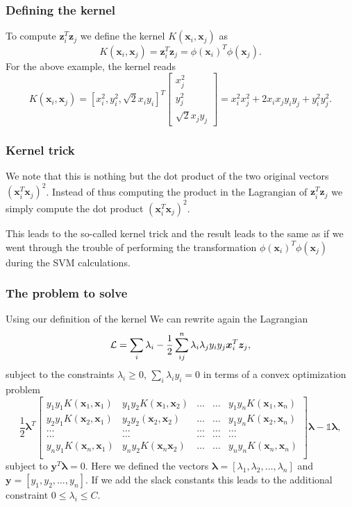 \documentclass{beamer}
\begin{document}
\begin{frame}
\frametitle{Defining the kernel}

To compute $\bm{z}_i^T\bm{z}_j$ we define the kernel $K(\bm{x}_i,\bm{x}_j)$ as
\[
K(\bm{x}_i,\bm{x}_j)=\bm{z}_i^T\bm{z}_j= \phi(\bm{x}_i)^T\phi(\bm{x}_j).
\]
For the above example, the kernel reads
\[
K(\bm{x}_i,\bm{x}_j)=[x_i^2, y_i^2, \sqrt{2}x_iy_i]^T\begin{bmatrix} x_j^2 \\ y_j^2 \\ \sqrt{2}x_jy_j \end{bmatrix}=x_i^2x_j^2+2x_ix_jy_iy_j+y_i^2y_j^2.
\]
\end{frame}

\begin{frame}
\frametitle{Kernel trick}

We note that this is nothing but the dot product of the two original
vectors $(\bm{x}_i^T\bm{x}_j)^2$. Instead of thus computing the
product in the Lagrangian of $\bm{z}_i^T\bm{z}_j$ we simply compute
the dot product $(\bm{x}_i^T\bm{x}_j)^2$.

This leads to the so-called
kernel trick and the result leads to the same as if we went through
the trouble of performing the transformation
$\phi(\bm{x}_i)^T\phi(\bm{x}_j)$ during the SVM calculations.
\end{frame}

\begin{frame}
\frametitle{The problem to solve}

Using our definition of the kernel We can rewrite again the Lagrangian
\[
{\cal L}=\sum_i\lambda_i-\frac{1}{2}\sum_{ij}^n\lambda_i\lambda_jy_iy_j\bm{x}_i^T\bm{z}_j,
\]
subject to the constraints $\lambda_i\geq 0$, $\sum_i\lambda_iy_i=0$ in terms of a convex optimization problem
\[
\frac{1}{2} \bm{\lambda}^T\begin{bmatrix} y_1y_1K(\bm{x}_1,\bm{x}_1) & y_1y_2K(\bm{x}_1,\bm{x}_2) & \dots & \dots & y_1y_nK(\bm{x}_1,\bm{x}_n) \\
y_2y_1K(\bm{x}_2,\bm{x}_1) & y_2y_2(\bm{x}_2,\bm{x}_2) & \dots & \dots & y_1y_nK(\bm{x}_2,\bm{x}_n) \\
\dots & \dots & \dots & \dots & \dots \\
\dots & \dots & \dots & \dots & \dots \\
y_ny_1K(\bm{x}_n,\bm{x}_1) & y_ny_2K(\bm{x}_n\bm{x}_2) & \dots & \dots & y_ny_nK(\bm{x}_n,\bm{x}_n) \\
\end{bmatrix}\bm{\lambda}-\mathbb{1}\bm{\lambda}, 
\]
subject to $\bm{y}^T\bm{\lambda}=0$. Here we defined the vectors $\bm{\lambda} =[\lambda_1,\lambda_2,\dots,\lambda_n]$ and 
$\bm{y}=[y_1,y_2,\dots,y_n]$. 
If we add the slack constants this leads to the additional constraint $0\leq \lambda_i \leq C$.
\end{frame}
\end{document}

